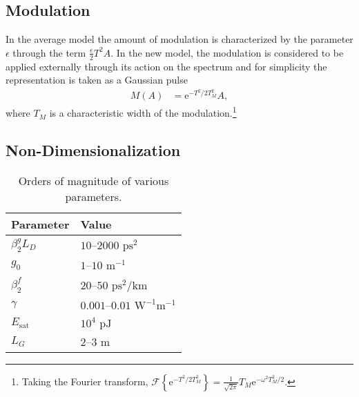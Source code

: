 \documentclass[12pt]{article}
\newcommand{\Es}{E_{\textrm{sat}}}
\newcommand{\FT}[1]{\mathcal{F}\left\{ #1 \right\}}
\begin{document}
\subsection{Modulation}
In the average model the amount of modulation is characterized by the parameter $\epsilon$ through the term $\frac{\epsilon}{2}T^2 A$. In the new model, the modulation is considered to be applied externally through its action on the spectrum and for simplicity the representation is taken as a Gaussian pulse 
\begin{align}
	M(A) &= \textrm{e}^{-T^2 / 2 T_M^2} A,
\end{align}
where $T_M$ is a characteristic width of the modulation.\footnote{Taking the Fourier transform, $\FT{\textrm{e}^{-T^2/ 2 T_M^2}} = \frac{1}{\sqrt{2\pi}}T_M\textrm{e}^{-\omega^2T_M^2/2}$.}

\subsection{Non-Dimensionalization}

\begin{wraptable}{r}{0.45\textwidth}
\begin{center}
\begin{tabular}{|l|l|}
\hline
Parameter & Value \\
\hline
$\beta_2^g L_D$ & $10$--$2000 \text{ ps}^2$ \\
$g_0$ & $1$--$10 \text{ m}^{-1}$ \\
$\beta_2^f$ & $20$--$50 \text{ ps}^2/ \text{km}$ \\
$\gamma$ & $0.001$--$0.01 \text{ W}^{-1} \text{m}^{-1}$ \cite{agrawal2013} \\
$\Es$ & $10^4 \text{ pJ}$ \\
$L_G$ & $2$--$3 \text{ m}$ \cite{burgoyne2014, shtyrina, yarutkina} \\
\hline
\end{tabular}
\caption{Orders of magnitude of various parameters.}
\label{tab:values}
\end{center}
\end{wraptable}
\end{document}
